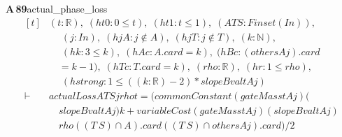 \documentclass[conference]{IEEEtran}
\theoremstyle{definition}
\newcommand{\lean}[1]{\textsf{\footnotesize #1}}
\begin{document}
\noindent\textbf{A\,89}\quad\lean{actual\_phase\_loss}
{\footnotesize\[ \begin{aligned}[t]
&(\mathit{t} : \mathbb{R} ),\; (\mathit{ht0} : 0 \leq \mathit{t}),\; (\mathit{ht1} : \mathit{t} \leq 1),\; (\mathit{A} \mathit{T} \mathit{S} : \mathit{Finset} (\mathit{I} \mathit{n})),\\
&\quad \; (\mathit{j} : \mathit{I} \mathit{n}),\; (\mathit{hjA} : \mathit{j} \notin \mathit{A}),\; (\mathit{hjT} : \mathit{j} \notin \mathit{T}),\; (\mathit{k} : \mathbb{N} ),\\
&\quad \; (\mathit{hk} : 3 \leq \mathit{k}),\; (\mathit{hAc} : \mathit{A}.\mathit{card}=\mathit{k}),\; (\mathit{hBc} : (\mathit{others} \mathit{A} \mathit{j}).\mathit{card}\\
&\quad =\mathit{k}-1),\; (\mathit{hTc} : \mathit{T}.\mathit{card}=\mathit{k}),\; (\mathit{rho} : \mathbb{R} ),\; (\mathit{hr} : 1 \leq \mathit{rho}),\\
&\quad \; (\mathit{hstrong} : 1 \leq ((\mathit{k}:\mathbb{R} )-2)*\mathit{slopeBval} \mathit{t} \mathit{A} \mathit{j})\\
\vdash\;&\mathit{actualLoss} \mathit{A} \mathit{T} \mathit{S} \mathit{j} \mathit{rho} \mathit{t} = (\mathit{commonConstant} (\mathit{gateMass} \mathit{t} \mathit{A} \mathit{j}) (\\
&\quad \mathit{slopeBval} \mathit{t} \mathit{A} \mathit{j}) \mathit{k}+ \mathit{variableCost} (\mathit{gateMass} \mathit{t} \mathit{A} \mathit{j}) (\mathit{slopeBval} \mathit{t} \mathit{A} \mathit{j})\\
&\quad \mathit{rho} ((\mathit{T} \ \mathit{S}) \cap \mathit{A}).\mathit{card} ((\mathit{T} \ \mathit{S}) \cap \mathit{others} \mathit{A} \mathit{j}).\mathit{card})/2
\end{aligned} \]}
\end{document}
